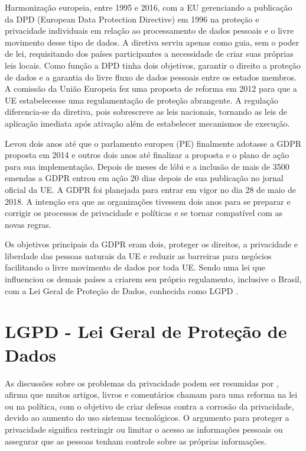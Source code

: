 Harmonização europeia, entre 1995 e 2016, com a EU gerenciando a publicação da DPD (European Data Protection Directive) em 1996 na proteção e privacidade individuais em relação ao processamento de dados pessoais e o livre movimento desse tipo de dados. A diretiva serviu apenas como guia, sem o poder de lei, requisitando dos países participantes a necessidade de criar suas próprias leis locais. Como função a DPD tinha dois objetivos, garantir o direito a proteção de dados e a garantia do livre fluxo de dados pessoais entre os estados membros. A comissão da União Europeia fez uma proposta de reforma em 2012 para que a UE estabelecesse uma regulamentação de proteção abrangente. A regulação diferencia-se da diretiva, pois sobrescreve as leis nacionais, tornando as leis de aplicação imediata após ativação além de estabelecer mecanismos de execução.

Levou dois anos até que o parlamento europeu (PE) finalmente adotasse a GDPR proposta em 2014 e outros dois anos até finalizar a proposta e o plano de ação para sua implementação. Depois de meses de lóbi e a inclusão de mais de 3500 emendas a GDPR entrou em ação 20 dias depois de sua publicação no jornal oficial da UE. A GDPR foi planejada para entrar em vigor no dia 28 de maio de 2018. A intenção era que as organizações tivessem dois anos para se preparar e corrigir os processos de privacidade e políticas e se tornar compatível com as novas regras.

Os objetivos principais da GDPR eram dois, proteger os direitos, a privacidade e liberdade das pessoas naturais da UE e reduzir as barreiras para negócios facilitando o livre movimento de dados por toda UE. Sendo uma lei que influenciou os demais países a criarem seu próprio regulamento, inclusive o Brasil, com a Lei Geral de Proteção de Dados, conhecida como LGPD \citep{candido_historico_2021}. 


\section{LGPD - Lei Geral de Proteção de Dados}

As discussões sobre os problemas da privacidade podem ser resumidas por \citet{Nissenbaum+2009}, afirma que muitos artigos, livros e comentários chamam para uma reforma na lei ou na política, com o objetivo de criar defesas contra a corrosão da privacidade, devido ao aumento do uso sistemas tecnológicos. O argumento para proteger a privacidade significa restringir ou limitar o acesso as informações pessoais ou assegurar que as pessoas tenham controle sobre as próprias informações.


